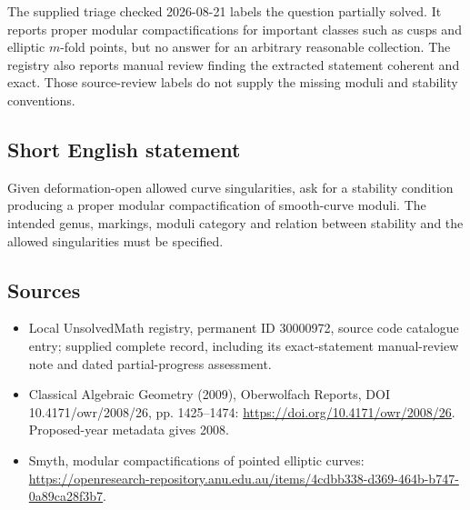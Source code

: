 \documentclass[11pt]{article}
\begin{document}
The supplied triage checked 2026-08-21 labels the question partially solved. It reports proper modular compactifications for important classes such as cusps and elliptic $m$-fold points, but no answer for an arbitrary reasonable collection. The registry also reports manual review finding the extracted statement coherent and exact. Those source-review labels do not supply the missing moduli and stability conventions.
\subsection{Short English statement}
Given deformation-open allowed curve singularities, ask for a stability condition producing a proper modular compactification of smooth-curve moduli. The intended genus, markings, moduli category and relation between stability and the allowed singularities must be specified.
\subsection{Sources}
\begin{itemize}
\item Local UnsolvedMath registry, permanent ID 30000972, source code catalogue entry; supplied complete record, including its exact-statement manual-review note and dated partial-progress assessment.
\item Classical Algebraic Geometry (2009), Oberwolfach Reports, DOI 10.4171/owr/2008/26, pp. 1425--1474: \url{https://doi.org/10.4171/owr/2008/26}. Proposed-year metadata gives 2008.
\item Smyth, modular compactifications of pointed elliptic curves: \url{https://openresearch-repository.anu.edu.au/items/4cdbb338-d369-464b-b747-0a89ca28f3b7}.
\end{itemize}
\end{document}
